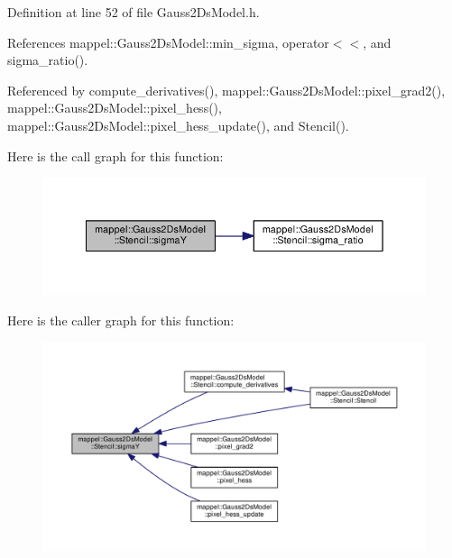 Definition at line 52 of file Gauss2\+Ds\+Model.\+h.



References mappel\+::\+Gauss2\+Ds\+Model\+::min\+\_\+sigma, operator$<$$<$, and sigma\+\_\+ratio().



Referenced by compute\+\_\+derivatives(), mappel\+::\+Gauss2\+Ds\+Model\+::pixel\+\_\+grad2(), mappel\+::\+Gauss2\+Ds\+Model\+::pixel\+\_\+hess(), mappel\+::\+Gauss2\+Ds\+Model\+::pixel\+\_\+hess\+\_\+update(), and Stencil().



Here is the call graph for this function\+:\nopagebreak
\begin{figure}[H]
\begin{center}
\leavevmode
\includegraphics[width=350pt]{classmappel_1_1Gauss2DsModel_1_1Stencil_abc29f317d508c398a3fcc337a1fb8d1f_cgraph}
\end{center}
\end{figure}




Here is the caller graph for this function\+:\nopagebreak
\begin{figure}[H]
\begin{center}
\leavevmode
\includegraphics[width=350pt]{classmappel_1_1Gauss2DsModel_1_1Stencil_abc29f317d508c398a3fcc337a1fb8d1f_icgraph}
\end{center}
\end{figure}


